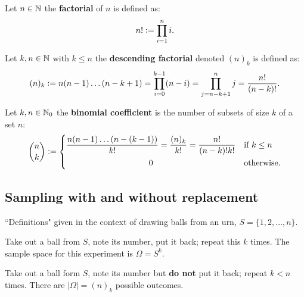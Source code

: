 \begingroup\belowdisplayskip=-0pt
    \begin{definition}[Factorial]
        Let $n\in\mathbb{N}$ the \textbf{factorial} of $n$ is defined as:
        \[
        n! := \prod_{i=1}^ni\textcolor{black}{.}
        \]
    \end{definition}
\endgroup

\begingroup\belowdisplayskip=-10pt
    \begin{definition}
        Let $k,n\in\mathbb{N}$ with $k\leq n$ the \textbf{descending factorial} denoted $(n)_k$ is defined as:
        \[
        (n)_k := n(n-1)\ldots(n-k+1) = \prod_{i=0}^{k-1}(n-i) = \prod_{j=n-k+1}^{n}j = \frac{n!}{(n-k)!}\textcolor{black}{.}
        \]
    \end{definition}
\endgroup

\begingroup\belowdisplayskip=-10pt
    \begin{definition}
        Let $k,n\in\mathbb{N}_0$ the \textbf{binomial coefficient} is the number of subsets of size $k$ of a set $n$:
        \[ 
            \binom{n}{k} := 
            \begin{dcases}
            \frac{n(n-1)\ldots(n-(k-1))}{k!} = \frac{(n)_k}{k!} = \frac{n!}{(n-k)!k!} & \textcolor{black}{\text{if }} k\leq n \\
            \omit\hfil0\hfil & \textcolor{black}{\text{otherwise.}}
            \end{dcases}
        \]
    \end{definition}
\endgroup


\subsection{Sampling with and without replacement}
``Definitions" given in the context of drawing balls from an urn, $S=\{1,2,\ldots,n\}$.
\begin{definition}
    Take out a ball from $S$, note its number, put it back; repeat this $k$ times. The sample space for this experiment is $\Omega = S^k$.
\end{definition}

\begin{definition}
    Take out a ball form $S$, note its number but \textbf{do not} put it back; repeat $k<n$ times. There are $|\Omega| = (n)_k$ possible outcomes.
\end{definition}


